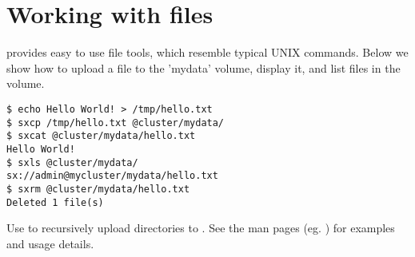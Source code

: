 \section*{Working with files}
\SX provides easy to use file tools, which resemble typical UNIX commands.
Below we show how to upload a file to the 'mydata' volume, display it,
and list files in the volume.

\begin{lstlisting}
$ echo Hello World! > /tmp/hello.txt
$ sxcp /tmp/hello.txt @cluster/mydata/
$ sxcat @cluster/mydata/hello.txt
Hello World!
$ sxls @cluster/mydata/
sx://admin@mycluster/mydata/hello.txt
$ sxrm @cluster/mydata/hello.txt
Deleted 1 file(s)
\end{lstlisting}
Use  to recursively upload directories to \SX. See the man pages
(eg. ) for examples and usage details.
